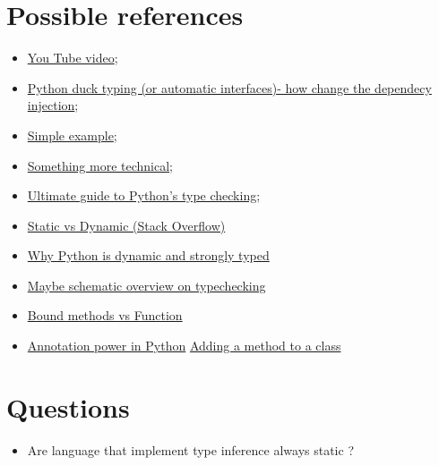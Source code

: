 \documentclass[12pt]{article}
\begin{document}
\maketitle
\tableofcontents
\listoftables
\listoffigures

\section{Possible references}
	\begin{itemize}
		\item \href{https://www.youtube.com/watch?v=fK5lcaNqdj4}{You Tube video};
		\item \href{https://hackernoon.com/python-duck-typing-or-automatic-interfaces-73988ec9037f}{Python duck typing (or automatic interfaces)- how change the dependecy injection};
		\item \href{https://medium.com/programming-hacks/duck-typing-in-python-6740aa72b301}{Simple example};
		\item \href{http://www.voidspace.org.uk/python/articles/duck_typing.shtml}{Something more technical};
		\item 
		\href{https://realpython.com/python-type-checking/}{Ultimate guide to Python's type checking;}
		\item
		\href{https://stackoverflow.com/questions/1517582/what-is-the-difference-between-statically-typed-and-dynamically-typed-languages}{Static vs Dynamic (Stack Overflow)}
		\item
		\href{https://wiki.python.org/moin/Why is Python a dynamic language and also a strongly typed language}{Why Python is dynamic and strongly typed}
		\item
		\href{https://android.jlelse.eu/magic-lies-here-statically-typed-vs-dynamically-typed-languages-d151c7f95e2b}{Maybe schematic overview on typechecking}
		\item
		\href{https://stackoverflow.com/questions/972/adding-a-method-to-an-existing-object-instance}{Bound methods vs Function}
		\item
		\href{https://stackoverflow.com/questions/41692473/does-python-type-hint-annotations-cause-some-run-time-effects}{Annotation power in Python}
		\href{https://stackoverflow.com/questions/972/adding-a-method-to-an-existing-object-instance}{Adding a method to a class}
	\end{itemize}

\section{Questions}
	\begin{itemize}
		\item Are language that implement type inference always static ?
	\end{itemize}
\newpage
\end{document}
